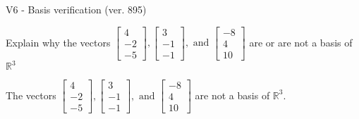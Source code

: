 \begin{exercise}
  \begin{exerciseTitle}V6 - Basis verification (ver. 895)\end{exerciseTitle}
  \begin{exerciseStatement}
    Explain why the vectors \(\left[\begin{array}{r}
4 \\
-2 \\
-5
\end{array}\right] , \left[\begin{array}{r}
3 \\
-1 \\
-1
\end{array}\right] , \text{ and } \left[\begin{array}{r}
-8 \\
4 \\
10
\end{array}\right]\) are or are not a basis of \(\mathbb{R}^3\)	


  \end{exerciseStatement}
  \begin{exerciseAnswer}
   The vectors \(\left[\begin{array}{r}
4 \\
-2 \\
-5
\end{array}\right] , \left[\begin{array}{r}
3 \\
-1 \\
-1
\end{array}\right] , \text{ and } \left[\begin{array}{r}
-8 \\
4 \\
10
\end{array}\right]\) 
  	 are not  a basis of \(\mathbb{R}^3\).
  


  \end{exerciseAnswer}
\end{exercise}